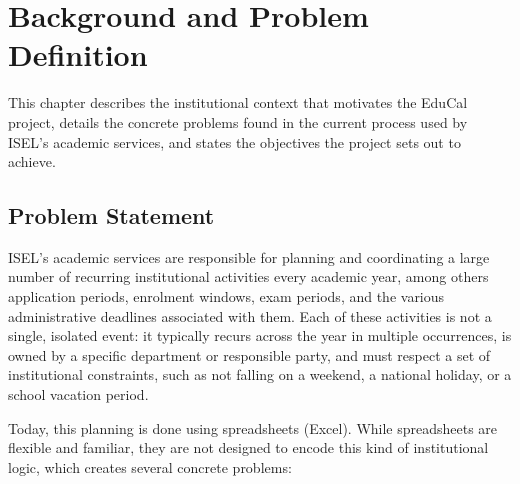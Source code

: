 %
%
\chapter{Background and Problem Definition} \label{cap:background}

This chapter describes the institutional context that motivates the EduCal project, details the concrete problems found in the current process used by ISEL's academic services, and states the objectives the project sets out to achieve.

\section{Problem Statement} \label{sec:problem-statement}

ISEL's academic services are responsible for planning and coordinating a large number of recurring institutional activities every academic year, among others application periods, enrolment windows, exam periods, and the various administrative deadlines associated with them. Each of these activities is not a single, isolated event: it typically recurs across the year in multiple occurrences, is owned by a specific department or responsible party, and must respect a set of institutional constraints, such as not falling on a weekend, a national holiday, or a school vacation period.

Today, this planning is done using spreadsheets (Excel). While spreadsheets are flexible and familiar, they are not designed to encode this kind of institutional logic, which creates several concrete problems:

